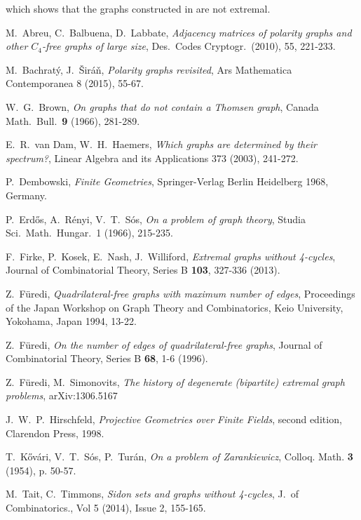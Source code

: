 \documentclass[12pt]{article}
\begin{document}
\noindent which shows that the graphs constructed in \cite{tait2013sidon} are not extremal.


\begin{thebibliography}{10}

    M.\ Abreu, C.\ Balbuena, D.\ Labbate,
    {\em Adjacency matrices of polarity graphs and other $C_4$-free graphs of large size},
    Des.\ Codes Cryptogr.\ (2010), 55, 221-233.

    M.\ Bachrat\'{y}, J.\ \v{S}ir\'{a}\v{n},
    {\em Polarity graphs revisited},
    Ars Mathematica Contemporanea 8 (2015), 55-67.

    W.\ G.\ Brown,
    {\em On graphs that do not contain a Thomsen graph},
    Canada Math.\ Bull.\ {\bf 9} (1966), 281-289.

    E.\ R.\ van Dam, W.\ H.\ Haemers,
    {\em Which graphs are determined by their spectrum?},
    Linear Algebra and its Applications 373 (2003), 241-272.

    P.\ Dembowski,
    {\em Finite Geometries},
    Springer-Verlag Berlin Heidelberg 1968, Germany.

    P.\ Erd\H{o}s, A.\ R\'{e}nyi, V.\ T.\ S\'{o}s,
    {\em On a problem of graph theory},
    Studia Sci.\ Math.\ Hungar.\ 1 (1966), 215-235.

    F.\ Firke, P.\ Kosek, E.\ Nash, J.\ Williford,
    {\em Extremal graphs without 4-cycles}, Journal of Combinatorial Theory, Series B {\bf 103}, 327-336 (2013).

    Z.\ F\"{u}redi,
    {\em Quadrilateral-free graphs with maximum number of edges},
    Proceedings of the Japan Workshop on Graph Theory and Combinatorics,
    Keio University, Yokohama, Japan 1994, 13-22.

    Z.\ F\"{u}redi,
    {\em On the number of edges of quadrilateral-free graphs},
    Journal of Combinatorial Theory, Series B {\bf 68}, 1-6 (1996).

    Z.\ F\"{u}redi, M.\ Simonovits,
    {\em The history of degenerate (bipartite) extremal graph problems},
    arXiv:1306.5167

    J.\ W.\ P.\ Hirschfeld,
    {\em Projective Geometries over Finite Fields}, second edition,
    Clarendon Press, 1998.

    T.\ K\H{o}v\'{a}ri, V.\ T.\ S\'{o}s, P.\ Tur\'{a}n,
    {\em On a problem of Zarankiewicz},
    Colloq. Math. {\bf 3} (1954), p. 50-57.

    M.\ Tait, C.\ Timmons,
    {\em Sidon sets and graphs without 4-cycles},
    J.\ of Combinatorics., Vol 5 (2014), Issue 2, 155-165.



\end{thebibliography}
\end{document}
